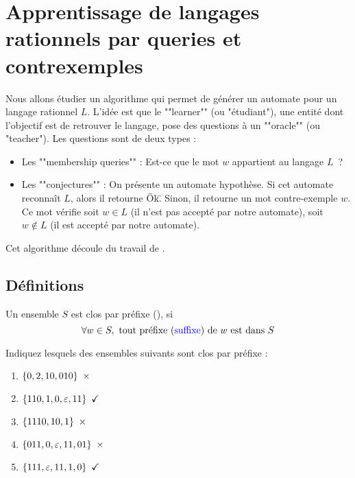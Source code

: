 \section{Apprentissage de langages rationnels par queries et contrexemples}

Nous allons étudier un algorithme qui permet de générer un automate pour un langage rationnel $L$.
L'idée est que le ""learner"" (ou "étudiant"), une entité dont l'objectif est de retrouver le langage, pose des
questions à un ""oracle"" (ou "teacher"). Les questions sont de deux types :

\begin{itemize}
	\item Les ""membership queries"" : Est-ce que le mot $w$  appartient au langage $L$ ?
	\item Les ""conjectures"" : On présente un automate hypothèse. Si cet automate reconnaît $L$, alors il retourne \"Ok\".
	      Sinon, il retourne un mot contre-exemple $w$. Ce mot vérifie soit $w \in L$ (il n’est pas accepté par notre
	      automate), soit $w \notin L$ (il est accepté par notre automate).
\end{itemize}

Cet algorithme découle du travail de \cite{angluinLearning}.


\subsection{Définitions}


\begin{definition}
	Un ensemble $S$ est clos par préfixe (), si
	$$\forall w \in S, \text{ tout préfixe (\textcolor{blue}{suffixe}) de $w$ est dans } S$$
\end{definition}

\begin{exercice}
	Indiquez lesquels des ensembles suivants sont clos par préfixe :
	\begin{enumerate}
		\item $\set{0,2,10,010} \ \times$
		\item $\set{110,1,0,\motvide,11} \ \checkmark$
		\item $\set{1110,10,1} \ \times$
		\item $\set{011,0,\motvide,11,01} \ \times$
		\item $\set{111,\motvide,11,1,0} \ \checkmark$
	\end{enumerate}
\end{exercice}

